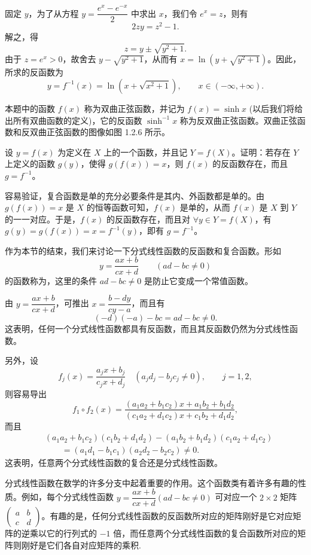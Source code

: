 \documentclass[UTF8,12pt,a4paper,fontset=fandol]{ctexbook}
\begin{document}
\noindent{}\quad 固定 $y$，为了从方程 $y=\dfrac{e^x-e^{-x}}{2}$ 中求出 $x$，我们令 $e^x=z$，则有
\[
  2zy=z^2-1.
\]
解之，得
\[
  z=y\pm\sqrt{y^2+1}.
\]
由于 $z=e^x>0$，故舍去 $y-\sqrt{y^2+1}$，从而有 $x=\ln(y+\sqrt{y^2+1})$。因此，所求的反函数为
\[
  y=f^{-1}(x)=\ln(x+\sqrt{x^2+1}),\qquad x\in(-\infty,+\infty).
\]

本题中的函数 $f(x)$ 称为双曲正弦函数，并记为 $f(x)=\sinh x$ (以后我们将给出所有双曲函数的定义)，它的反函数 $\sinh^{-1}x$ 称为反双曲正弦函数。双曲正弦函数和反双曲正弦函数的图像如图 1.2.6 所示。

\noindent{}\quad 设 $y=f(x)$ 为定义在 $X$ 上的一个函数，并且记 $Y=f(X)$。证明：若存在 $Y$ 上定义的函数 $g(y)$，使得 $g(f(x))=x$，则 $f(x)$ 的反函数存在，而且 $g=f^{-1}$。

\noindent{}\quad 容易验证，复合函数是单的充分必要条件是其内、外函数都是单的。由 $g(f(x))=x$ 是 $X$ 的恒等函数可知，$f(x)$ 是单的，从而 $f(x)$ 是 $X$ 到 $Y$ 的一一对应。于是，$f(x)$ 的反函数存在，而且对 $\forall y\in Y=f(X)$，有 $g(y)=g(f(x))=x=f^{-1}(y)$，即有 $g=f^{-1}$。

作为本节的结束，我们来讨论一下分式线性函数的反函数和复合函数。形如
\[
  y=\frac{ax+b}{cx+d}\qquad (ad-bc\ne0)
\]
的函数称为，这里的条件 $ad-bc\ne0$ 是防止它变成一个常值函数。

由 $y=\dfrac{ax+b}{cx+d}$，可推出 $x=\dfrac{b-dy}{cy-a}$，而且有
\[
  (-d)(-a)-bc=ad-bc\ne0.
\]
这表明，任何一个分式线性函数都具有反函数，而且其反函数仍然为分式线性函数。

另外，设
\[
  f_j(x)=\frac{a_jx+b_j}{c_jx+d_j}\quad (a_jd_j-b_jc_j\ne0),\qquad j=1,2,
\]
则容易导出
\[
  f_1\circ f_2(x)=
  \frac{(a_1a_2+b_1c_2)x+a_1b_2+b_1d_2}
  {(c_1a_2+d_1c_2)x+c_1b_2+d_1d_2},
\]
而且
\[
\begin{aligned}
 &(a_1a_2+b_1c_2)(c_1b_2+d_1d_2)
 -(a_1b_2+b_1d_2)(c_1a_2+d_1c_2)\\
 &\qquad=(a_1d_1-b_1c_1)(a_2d_2-b_2c_2)\ne0.
\end{aligned}
\]
这表明，任意两个分式线性函数的复合还是分式线性函数。

分式线性函数在数学的许多分支中起着重要的作用。这个函数类有着许多有趣的性质。例如，每个分式线性函数 $y=\dfrac{ax+b}{cx+d}(ad-bc\ne0)$ 可对应一个 $2\times2$ 矩阵 $\begin{pmatrix}a&b\\ c&d\end{pmatrix}$。有趣的是，任何分式线性函数的反函数所对应的矩阵刚好是它对应矩阵的逆乘以它的行列式的 $-1$ 倍，而任意两个分式线性函数的复合函数所对应的矩阵则刚好是它们各自对应矩阵的乘积.
\end{document}
